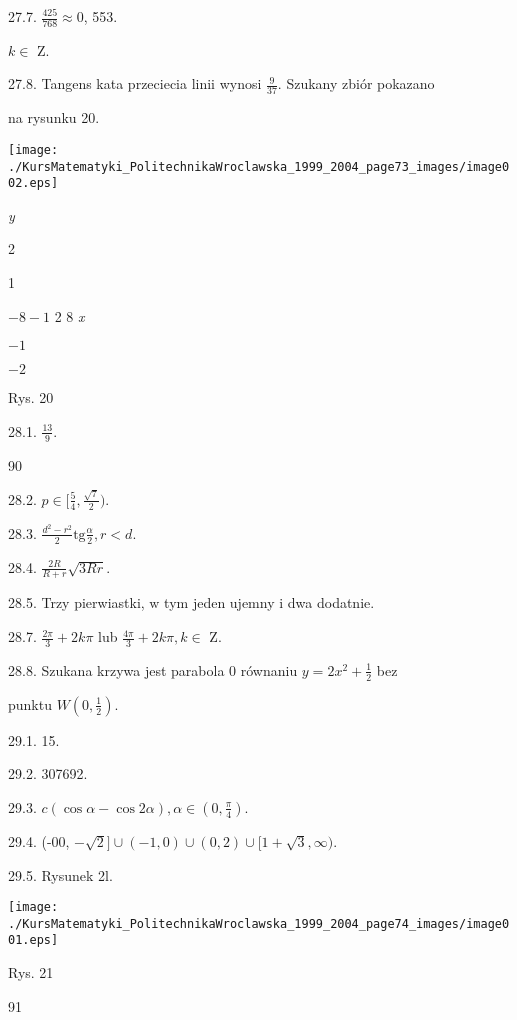 \documentclass[a4paper,12pt]{article}
\begin{document}
27.7. $\displaystyle \frac{425}{768}\approx 0$, 553.

$ k\in$ Z.

27.8. Tangens kata przeciecia linii wynosi $\displaystyle \frac{9}{37}$. Szukany zbiór pokazano

na rysunku 20.
\begin{center}
\texttt{[image: ./KursMatematyki\_PolitechnikaWroclawska\_1999\_2004\_page73\_images/image002.eps]}
\end{center}
{\it y}

2

1

$-8  -1$  2  8  {\it x}

$-1$

$-2$

Rys. 20

28.1. $\displaystyle \frac{13}{9}.$





90

28.2. $ p\in [\displaystyle \frac{5}{4},\frac{\sqrt{7}}{2}).$

28.3. $\displaystyle \frac{d^{2}-r^{2}}{2}\mathrm{t}\mathrm{g}\frac{\alpha}{2}, r<d.$

28.4. $\displaystyle \frac{2R}{R+r}\sqrt{3Rr}.$

28.5. Trzy pierwiastki, $\mathrm{w}$ tym jeden ujemny $\mathrm{i}$ dwa dodatnie.

28.7. $\displaystyle \frac{2\pi}{3}+2k\pi$ lub $\displaystyle \frac{4\pi}{3}+2k\pi,  k\in$ Z.

28.8. Szukana krzywa jest parabola $0$ równaniu $y = 2x^{2}+ \displaystyle \frac{1}{2}$ bez

punktu $W(0,\displaystyle \frac{1}{2}).$

29.1. 15.

29.2. 307692.

29.3. $c(\cos\alpha-\cos 2\alpha), \alpha\in (0,\displaystyle \frac{\pi}{4}).$

29.4. (-00, $-\sqrt{2}]\cup(-1,0)\cup(0,2)\cup[1+\sqrt{3},\infty).$

29.5. Rysunek 2l.
\begin{center}
\texttt{[image: ./KursMatematyki\_PolitechnikaWroclawska\_1999\_2004\_page74\_images/image001.eps]}
\end{center}
Rys. 21





91
\end{document}
